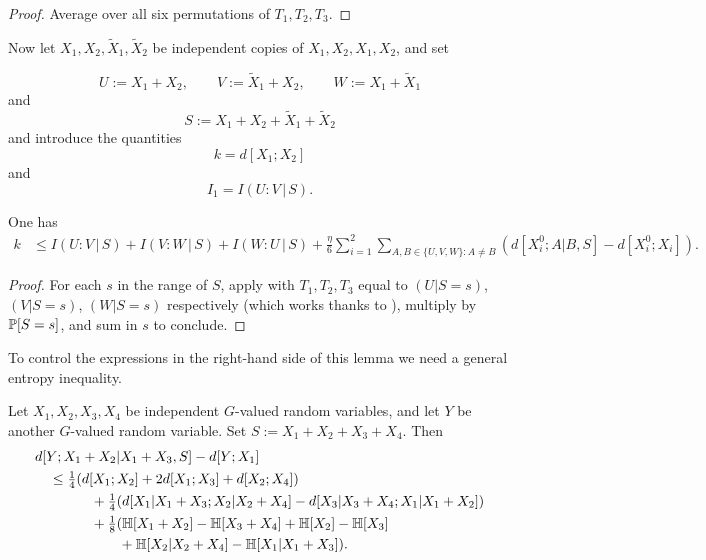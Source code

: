 \begin{proof}
\leanok
Average  over all six permutations of $T_1,T_2,T_3$.
\end{proof}

Now let $X_1, X_2, \tilde X_1, \tilde X_2$ be independent copies of $X_1, X_2, X_1, X_2$, and set

\[U := X_1 + X_2, \qquad V := \tilde X_1 + X_2, \qquad W := X_1 + \tilde X_1\] and
\[  S := X_1 + X_2 + \tilde X_1 + \tilde X_2\]
and introduce the quantities
$$ k = d[X_1;X_2]$$
and
$$ I_1 = I(U : V \, | \, S).$$

\begin{lemma}\label{averaged-construct-good}\leanok
  One has
  \begin{align*}  k & \leq I(U : V \, | \, S) + I(V : W \, | \,S) + I(W : U \, | \, S) + \frac{\eta}{6}  \sum_{i=1}^2 \sum_{A,B \in \{U,V,W\}: A \neq B} (d[X^0_i;A|B,S] - d[X^0_i; X_i]).
    \end{align*}
\end{lemma}

\begin{proof}\leanok  For each $s$ in the range of $S$, apply  with $T_1,T_2,T_3$ equal to $(U|S=s)$, $(V|S=s)$, $(W|S=s)$ respectively (which works thanks to ), multiply by $\mathbb{P}[S=s]$, and sum in $s$ to conclude.
\end{proof}

To control the expressions in the right-hand side of this lemma we need a general entropy inequality.

\begin{lemma}\label{gen-ineq} \leanok
Let $X_1, X_2, X_3, X_4$ be independent $G$-valued random variables, and let $Y$ be another $G$-valued random variable.  Set $S := X_1+X_2+X_3+X_4$. Then
  \begin{align*}
    &  d[Y; X_1+X_2|X_1 + X_3, S] - d[Y; X_1] \\
    &\quad \leq \tfrac{1}{4} (d[X_1;X_2] + 2d[X_1;X_3] + d[X_2;X_4])\\
    &\qquad \qquad + \tfrac{1}{4} (d[X_1|X_1+X_3;X_2|X_2+X_4] - d[X_3|X_3+X_4; X_1|X_1+X_2])\\
    &\qquad \qquad + \tfrac{1}{8} (\mathbb{H}[X_1+X_2] - \mathbb{H}[X_3+X_4] + \mathbb{H}[X_2] - \mathbb{H}[X_3]\\
    &\qquad \qquad \qquad + \mathbb{H}[X_2|X_2+X_4] - \mathbb{H}[X_1|X_1+X_3]).
\end{align*}
\end{lemma}

